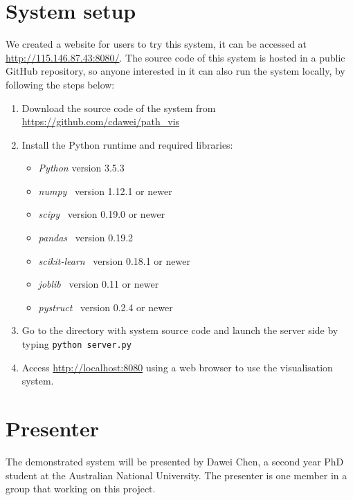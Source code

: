 \documentclass[sigconf]{acmart}
\begin{document}
\section{System setup}
\label{sec:setup}
We created a website for users to try this system, it can be accessed at \url{http://115.146.87.43:8080/}.
The source code of this system is hosted in a public GitHub repository, 
so anyone interested in it can also run the system locally, by following the steps below:
\begin{enumerate}
\item Download the source code of the system from \url{https://github.com/cdawei/path_vis} 
\item Install the Python runtime and required libraries: 
      \begin{itemize}
      \item \textit{Python} version 3.5.3
      \item \textit{numpy}~\cite{numpy} version 1.12.1 or newer
      \item \textit{scipy}~\cite{scipy} version 0.19.0 or newer
      \item \textit{pandas}~\cite{pandas} version 0.19.2
      \item \textit{scikit-learn}~\cite{sklearn} version 0.18.1 or newer
      \item \textit{joblib}~\cite{joblib} version 0.11 or newer
      \item \textit{pystruct}~\cite{JMLR:v15:mueller14a} version 0.2.4 or newer
      \end{itemize}
\item Go to the directory with system source code and launch the server side by typing \texttt{python server.py}
\item Access \url{http://localhost:8080} using a web browser to use the visualisation system.
\end{enumerate}


\section{Presenter}
\label{sec:presenter}
The demonstrated system will be presented by Dawei Chen, a second year PhD student at the Australian National University.
The presenter is one member in a group that working on this project.



 
\end{document}
